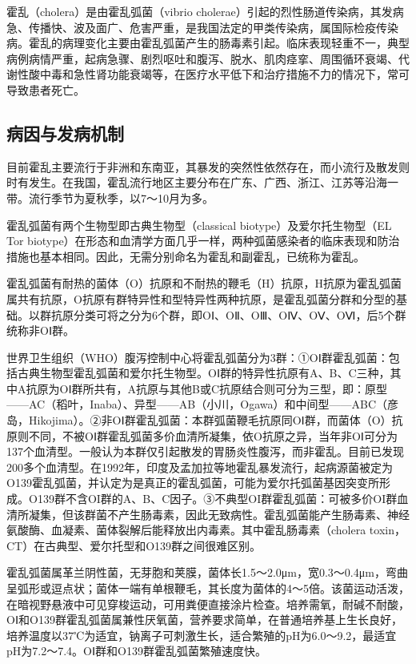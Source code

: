 霍乱（cholera）是由霍乱弧菌（vibrio
cholerae）引起的烈性肠道传染病，其发病急、传播快、波及面广、危害严重，是我国法定的甲类传染病，属国际检疫传染病。霍乱的病理变化主要由霍乱弧菌产生的肠毒素引起。临床表现轻重不一，典型病例病情严重，起病急骤、剧烈呕吐和腹泻、脱水、肌肉痉挛、周围循环衰竭、代谢性酸中毒和急性肾功能衰竭等，在医疗水平低下和治疗措施不力的情况下，常可导致患者死亡。

\subsection{病因与发病机制}

目前霍乱主要流行于非洲和东南亚，其暴发的突然性依然存在，而小流行及散发则时有发生。在我国，霍乱流行地区主要分布在广东、广西、浙江、江苏等沿海一带。流行季节为夏秋季，以7～10月为多。

霍乱弧菌有两个生物型即古典生物型（classical biotype）及爱尔托生物型（EL
Tor
biotype）在形态和血清学方面几乎一样，两种弧菌感染者的临床表现和防治措施也基本相同。因此，无需分别命名为霍乱和副霍乱，已统称为霍乱。

霍乱弧菌有耐热的菌体（O）抗原和不耐热的鞭毛（H）抗原，H抗原为霍乱弧菌属共有抗原，O抗原有群特异性和型特异性两种抗原，是霍乱弧菌分群和分型的基础。以群抗原分类可将之分为6个群，即OⅠ、OⅡ、OⅢ、OⅣ、OⅤ、OⅥ，后5个群统称非OⅠ群。

世界卫生组织（WHO）腹泻控制中心将霍乱弧菌分为3群：①OⅠ群霍乱弧菌：包括古典生物型霍乱弧菌和爱尔托生物型。OⅠ群的特异性抗原有A、B、C三种，其中A抗原为OⅠ群所共有，A抗原与其他B或C抗原结合则可分为三型，即：原型------AC（稻叶，Inaba）、异型------AB（小川，Ogawa）和中间型------ABC（彦岛，Hikojima）。②非OⅠ群霍乱弧菌：本群弧菌鞭毛抗原同OⅠ群，而菌体（O）抗原则不同，不被OⅠ群霍乱弧菌多价血清所凝集，依O抗原之异，当年非OⅠ可分为137个血清型。一般认为本群仅引起散发的胃肠炎性腹泻，而非霍乱。目前已发现200多个血清型。在1992年，印度及孟加拉等地霍乱暴发流行，起病源菌被定为O139霍乱弧菌，并认定为是真正的霍乱弧菌，可能为爱尔托弧菌基因突变所形成。O139群不含OI群的A、B、C因子。③不典型OI群霍乱弧菌：可被多价OI群血清所凝集，但该群菌不产生肠毒素，因此无致病性。霍乱弧菌能产生肠毒素、神经氨酸酶、血凝素、菌体裂解后能释放出内毒素。其中霍乱肠毒素（cholera
toxin，CT）在古典型、爱尔托型和O139群之间很难区别。

霍乱弧菌属革兰阴性菌，无芽胞和荚膜，菌体长1.5～2.0μm，宽0.3～0.4μm，弯曲呈弧形或逗点状；菌体一端有单根鞭毛，其长度为菌体的4～5倍。该菌运动活泼，在暗视野悬液中可见穿梭运动，可用粪便直接涂片检查。培养需氧，耐碱不耐酸，OⅠ和O139群霍乱弧菌属兼性厌氧菌，营养要求简单，在普通培养基上生长良好，培养温度以37℃为适宜，钠离子可刺激生长，适合繁殖的pH为6.0～9.2，最适宜pH为7.2～7.4。OⅠ群和O139群霍乱弧菌繁殖速度快。

